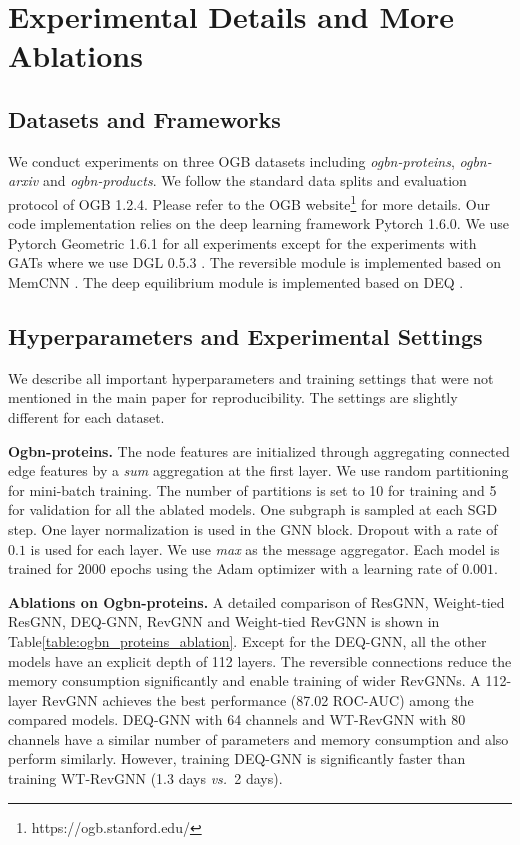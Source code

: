 \documentclass{article}
\newcommand{\vs}{\emph{vs.~}}
\newcommand{\tblLabel}{Table\xspace}
\newcommand{\mysection}[1]{\vspace{0pt}\noindent\textbf{#1.}}
\begin{document}
\section{Experimental Details and More Ablations}

\subsection{Datasets and Frameworks}
We conduct experiments on three OGB datasets \citep{hu2020open} including \textit{ogbn-proteins}, \textit{ogbn-arxiv} and \textit{ogbn-products}. We follow the standard data splits and evaluation protocol of OGB 1.2.4. Please refer to the OGB website\footnote{https://ogb.stanford.edu/} for more details. Our code implementation relies on the deep learning framework Pytorch 1.6.0. We use Pytorch Geometric 1.6.1 \citep{Fey/Lenssen/2019} for all experiments except for the experiments with GATs where we use DGL 0.5.3 \citep{wang2019dgl}. The reversible module is implemented based on MemCNN \citep{vandeLeemput2019MemCNN}. The deep equilibrium module is implemented based on DEQ \citep{bai2019deep}.

\subsection{Hyperparameters and Experimental Settings}
We describe all important hyperparameters and training settings that were not mentioned in the main paper for reproducibility. The settings are slightly different for each dataset.

\mysection{Ogbn-proteins} The node features are initialized through aggregating connected edge features by a \emph{sum} aggregation at the first layer. We use random partitioning for mini-batch training. The number of partitions is set to 10 for training and 5 for validation for all the ablated models. One subgraph is sampled at each SGD step. One layer normalization is used in the GNN block. Dropout with a rate of $0.1$ is used for each layer. We use \emph{max} as the message aggregator. Each model is trained for $2000$ epochs using the Adam optimizer with a learning rate of $0.001$.

\mysection{Ablations on Ogbn-proteins}
A detailed comparison of ResGNN, Weight-tied ResGNN, DEQ-GNN, RevGNN and Weight-tied RevGNN is shown in \tblLabel \ref{table:ogbn_proteins_ablation}. Except for the DEQ-GNN, all the other models have an explicit depth of 112 layers. The reversible connections reduce the memory consumption significantly and enable training of wider RevGNNs. A 112-layer RevGNN achieves the best performance (87.02 ROC-AUC) among the compared models. DEQ-GNN with 64 channels and WT-RevGNN with 80 channels have a similar number of parameters and memory consumption and also perform similarly. However, training DEQ-GNN is significantly faster than training WT-RevGNN (1.3 days \vs 2 days).
\end{document}
